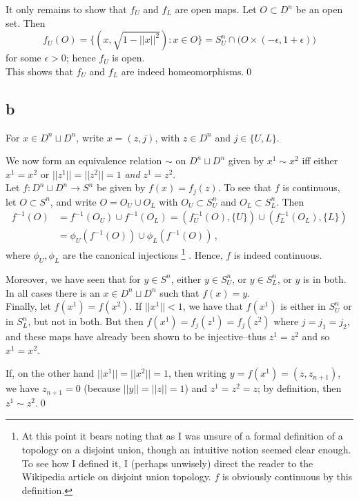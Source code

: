\documentclass[11pt]{amsart}
\theoremstyle{definition}
\numberwithin{equation}{section}
\begin{document}
It only remains to show that $f_U$ and $f_L$ are open maps. Let $O \subset D^n$ be an open set. Then
\begin{equation}
f_U(O)
= \{
(x, \sqrt{1-||x||^2}) : x \in O
\}
= S_U^n \cap
\Big(O \times (-\epsilon, 1 + \epsilon)\Big)
\end{equation}
for some $\epsilon > 0$; hence $f_U$ is open.
\\

This shows that $f_U$ and $f_L$ are indeed homeomorphisms.\qed
\subsection*{b}
For $x\in D^n \sqcup D^n$, write $x = (z, j)$, with $z\in D^n$ and $j \in \{U,L\}$.

We now form an equivalence relation $\sim$ on $D^n \sqcup D^n$ given by $x^1 \sim x^2$ iff either $x^1 = x^2$ or $||z^1|| = ||z^2|| = 1$ \emph{and} $z^1 = z^2$.
\\

Let $f: D^n \sqcup D^n \to S^n$ be given by $f(x) = f_j(z)$. To see that $f$ is continuous, let $O \subset S^n$, and write $O = O_U \cup O_L$ with $O_U \subset S^n_U$ and $O_L \subset S^n_L$. Then 
\begin{align*}
f^{-1}(O)
&= f^{-1}(O_U) \cup f^{-1}(O_L)
= (f_U^{-1}(O), \{U\}) \cup (f_L^{-1}(O_L), \{L\}) \\
&= \phi_U(f^{-1}(O)) \cup \phi_L(f^{-1}(O))\,,
\end{align*}
where $\phi_U, \phi_L$ are the canonical injections
\footnote{
At this point it bears noting that as I was unsure of a formal definition of a topology on a disjoint union, though an intuitive notion seemed clear enough. To see how I defined it, I (perhaps unwisely) direct the reader to the Wikipedia article on disjoint union topology. $f$ is obviously continuous by this definition.
}
. Hence, $f$ is indeed continuous.

Moreover, we have seen that for $y \in S^n$, either $y \in S^n_U$, or $y \in S^n_L$, or $y$ is in both. In all cases there is an $x \in D^n \sqcup D^n$ such that $f(x) = y$.
\\

Finally, let $f(x^1) = f(x^2)$. If $||x^1|| < 1$, we have that $f(x^1)$ is either in $S^n_U$ or in $S^n_L$, but not in both. But then $f(x^1) = f_j(z^1) = f_j(z^2)$ where $j = j_1 = j_2$, and these maps have already been shown to be injective--thus $z^1 = z^2$ and so $x^1 = x^2$.

If, on the other hand $||x^1|| = ||x^2|| = 1$, then writing $y = f(x^1) = (z, z_{n+1})$, we have $z_{n+1} = 0$ (because $||y|| = ||z|| = 1$) and $z^1 = z^2 = z$; by definition, then $z^1 \sim z^2$.\qed
\end{document}
